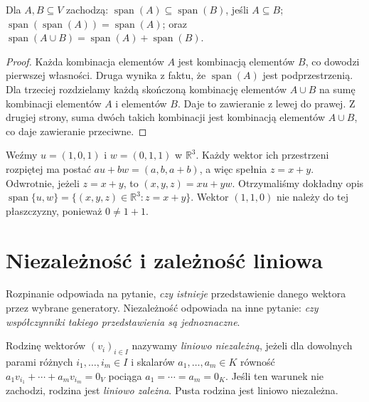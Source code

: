 \begin{stwierdzenie}
\label{prop:lin-span-reguly}
Dla \(A,B\subseteq V\) zachodzą:
\(\operatorname{span}(A)\subseteq\operatorname{span}(B)\),
jeśli \(A\subseteq B\);
\(\operatorname{span}(\operatorname{span}(A))
=\operatorname{span}(A)\);
oraz
\(\operatorname{span}(A\cup B)
=\operatorname{span}(A)+\operatorname{span}(B)\).
\end{stwierdzenie}
\begin{proof}
Każda kombinacja elementów \(A\) jest kombinacją
elementów \(B\), co dowodzi pierwszej własności.
Druga wynika z faktu, że \(\operatorname{span}(A)\)
jest podprzestrzenią. Dla trzeciej rozdzielamy
każdą skończoną kombinację elementów \(A\cup B\)
na sumę kombinacji elementów \(A\) i elementów \(B\).
Daje to zawieranie z lewej do prawej. Z drugiej strony,
suma dwóch takich kombinacji jest kombinacją elementów
\(A\cup B\), co daje zawieranie przeciwne.
\end{proof}

\begin{przyklad}
\label{prz:lin-span-r3}
Weźmy \(u=(1,0,1)\) i \(w=(0,1,1)\) w \(\mathbb R^3\).
Każdy wektor ich przestrzeni rozpiętej ma postać
\(au+bw=(a,b,a+b)\), a więc spełnia \(z=x+y\).
Odwrotnie, jeżeli \(z=x+y\), to
\((x,y,z)=xu+yw\). Otrzymaliśmy dokładny opis
\(\operatorname{span}\{u,w\}
=\{(x,y,z)\in\mathbb R^3:z=x+y\}\).
Wektor \((1,1,0)\) nie należy do tej płaszczyzny,
ponieważ \(0\neq1+1\).
\end{przyklad}

\section{Niezależność i zależność liniowa}
\label{sec:lin-niezaleznosc}

Rozpinanie odpowiada na pytanie, \emph{czy istnieje}
przedstawienie danego wektora przez wybrane generatory.
Niezależność odpowiada na inne pytanie: \emph{czy współczynniki
takiego przedstawienia są jednoznaczne}.

\begin{definicja}
\label{def:lin-niezaleznosc}
Rodzinę wektorów \((v_i)_{i\in I}\) nazywamy
\emph{liniowo niezależną}, jeżeli dla dowolnych parami
różnych \(i_1,\ldots,i_m\in I\) i skalarów
\(a_1,\ldots,a_m\in K\) równość
\(a_1v_{i_1}+\cdots+a_mv_{i_m}=0_V\)
pociąga \(a_1=\cdots=a_m=0_K\).
Jeśli ten warunek nie zachodzi, rodzina jest
\emph{liniowo zależna}.
Pusta rodzina jest liniowo niezależna.
\end{definicja}

